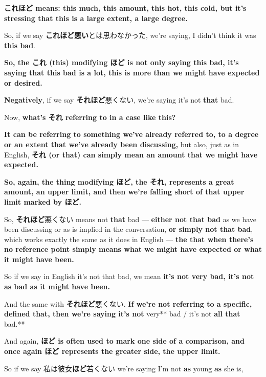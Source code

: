 {\bf これほど means: this much, this amount, this hot, this cold, but it's stressing that this is a large extent, a large degree.}

\startsectionlevel[title={ほど},reference={ほど}]

So, if we say {\bf これほど悪い}とは思わなかった, we're saying, I didn't think it was {\bf this bad}.

{\bf So, the これ (this) modifying ほど is not only saying this bad, it's saying that this bad is a lot, this is more than we might have expected or desired.}

{}

{\bf Negatively}, if we say {\bf それほど}悪くない, we're saying it's not {\bf that} bad.

{}

Now, {\bf what's それ referring to in a case like this?}

{\bf It can be referring to something we've already referred to, to a degree or an extent that we've already been discussing,} but also, just as in English, {\bf それ (or that) can simply mean an amount that we might have expected.}

\thinrule

{\bf So, again, the thing modifying ほど, the それ, represents a great amount, an upper limit, and then we're falling short of that upper limit marked by ほど.}

So, {\bf それほど}悪くない means not {\bf that} bad --- {\bf either not that bad} as we have been discussing or as is implied in the conversation, {\bf or simply not that bad}, which works exactly the same as it does in English --- {\bf the that when there's no reference point simply means what we might have expected or what it might have been.}

So if we say in English it's not that bad, we mean {\bf it's not very bad, it's not as bad as it might have been.}

\thinrule

And the same with {\bf それほど}悪くない. {\bf If we're not referring to a specific, defined that, then we're saying it's not }very** bad / it's not {\bf all that} bad.**

And again, {\bf ほど is often used to mark one side of a comparison, and once again ほど represents the greater side, the upper limit.}

So if we say 私は彼女{\bf ほど}若くない we're saying I'm not {\bf as} young {\bf as} she is,

